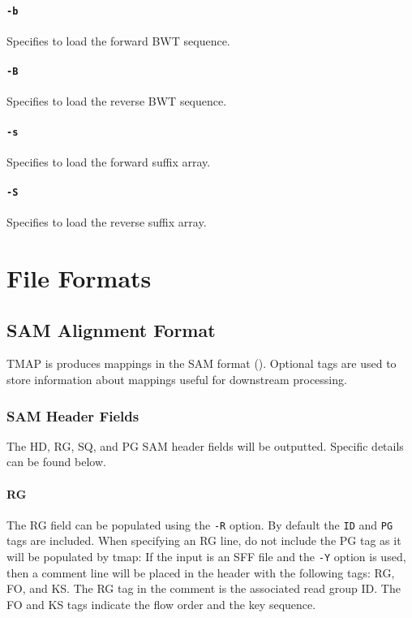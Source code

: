 \documentclass[a4paper,12pt]{book}
\newcommand{\TT}[1]{{\tt #1}} %
\begin{document}
\subsubsection{\TT{-b}}
Specifies to load the forward BWT sequence.

\subsubsection{\TT{-B}}
Specifies to load the reverse BWT sequence.

\subsubsection{\TT{-s}}
Specifies to load the forward suffix array.

\subsubsection{\TT{-S}}
Specifies to load the reverse suffix array.

\chapter{File Formats}

\section{SAM Alignment Format}
TMAP is produces mappings in the SAM format (\cite{SAM-format}).
Optional tags are used to store information about mappings useful for downstream processing.

\subsection{SAM Header Fields}

The HD, RG, SQ, and PG SAM header fields will be outputted.
Specific details can be found below.

\subsubsection{RG}
The RG field can be populated using the \TT{-R} option.
By default the \TT{ID} and \TT{PG} tags are included.
When specifying an RG line, do not include the PG tag as it will be populated by tmap:
If the input is an SFF file and the \TT{-Y} option is used, then a comment line will be placed in the header with the following tags:
RG, FO, and KS.
The RG tag in the comment is the associated read group ID.
The FO and KS tags indicate the flow order and the key sequence.
\end{document}
